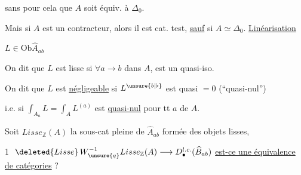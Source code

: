 sans pour cela que $A$ soit équiv. à $\Delta_0$.

Mais si $A$ est un contracteur, alors il est cat. test, \uline{sauf} si $A\simeq\Delta_0$.
\uline{Linéarisation}


$L\in\mathrm{Ob}\widehat A_{ab}$

On dit que $L$ est lisse si $\forall a\longrightarrow b$ dans $A$,
est un quasi-iso.

On dit que $L$ est \uline{négligeable} si $L^{\unsure{b|\flat}}$ est quasi $=0$ (``quasi-nul'')

i.e. si $\displaystyle\int_{A_a}L=\int_A L^{(a)}$ est \uline{quasi-nul} pour tt $a$ de $A$.



Soit  $Lisse_{\mathbb Z}(A)$ la sous-cat pleine de $\widehat A_{ab}$ formée des objets lisses,


\textcircled{1} $\deleted{Lisse}\,W_{\unsure{q}}^{-1}Lisse_{\mathbb Z}(A)\longrightarrow D_\bullet^{l.c.}(\widehat B_{ab})$ \uline{est-ce une équivalence de catégories} ?

